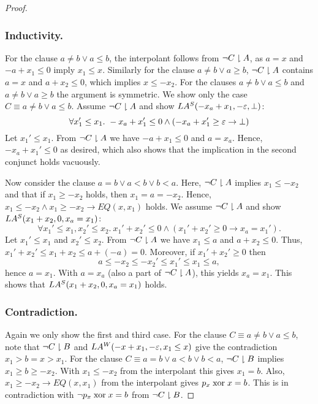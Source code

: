 \begin{techreport}
\begin{proof}
  \subsubsection*{Inductivity.}  
  \ifnewinterpolation
  For the clause $a\neq b\lor a\leq b$, the interpolant follows 
  from $\lnot C\proj A$, as $a=x$ and $-a + x_1 \leq 0$
  imply $x_1\leq x$. Similarly for the clause $a\neq b\lor a\geq b$,
  $\lnot C\proj A$ contains
  $a=x$ and $a + x_2 \leq 0$, which implies $x \leq -x_2$.
  \else
  For the clauses $a\neq b\lor a\leq b$ and $a\neq b\lor a\geq b$ the argument
  is symmetric.  We show only the case $C \equiv a\neq b \lor a\leq b$. 
  Assume $\lnot C\proj A$ and show $LA\S(-x_a+x_1,-\eps,\bot)$:
  \[
  \forall x_1' \leq x_1.~ -x_a+x_1' \leq 0 \land 
  (-x_a+x_1' \geq \eps \rightarrow \bot)
  \]
  Let $x_1'\leq x_1$. From $\lnot C \proj A$ we have $-a+x_1\leq 0$ and
  $a=x_a$. Hence, $-x_a + x_1' \leq 0$ as desired, which also shows that the
  implication in the second conjunct holds vacuously.

  \fi
  Now consider the clause $a= b\lor a< b \lor b< a$.
  \ifnewinterpolation
  Here, $\lnot C\proj A$ implies $x_1\leq -x_2$ and 
  that if $x_1\geq -x_2$ holds, then $x_1 = a =-x_2$. 
  Hence, $x_1\leq -x_2 \land x_1 \geq -x_2 \rightarrow EQ(x, x_1)$ holds.
  \else
  We assume $\lnot C\proj A$ and show $LA\S(x_1+x_2,0,x_a=x_1)$:
  \[\forall x_1' \leq x_1, x_2' \leq x_2.~ 
  x_1'+x_2' \leq 0 \land (x_1'+x_2' \geq 0 \rightarrow x_a = x_1').\]
  Let $x_1'\leq x_1$ and $x_2'\leq x_2$. 
  From $\lnot C\proj A$ we have $x_1 \leq a$ and $a+x_2\leq 0$.
  Thus, $x_1'+x_2' \leq x_1+x_2 \leq a + (-a) = 0$.
  Moreover, if $x_1'+x_2' \geq 0$ then
  \[ a\leq -x_2 \leq -x_2' \leq x_1' \leq x_1 \leq a,\]
  hence $a=x_1$.  With $a=x_a$ (also a part of $\lnot C \proj A$),
  this yields $x_a=x_1$.
  This shows that $LA\S(x_1+x_2,0,x_a=x_1)$ holds.
  \fi
  
  \subsubsection*{Contradiction.}
  Again we only show the first and third case. For the clause
  $C \equiv a\neq b \lor a\leq b$,
  \ifnewinterpolation
  note that $\lnot C\proj B$ and $LA\W(-x+x_1,-\eps,x_1 \leq x)$ 
  give the contradiction $x_1 > b = x > x_1$.
  For the clause $C \equiv a= b\lor a< b \lor b< a$,
  $\lnot C\proj B$ implies $x_1 \geq b \geq -x_2$. 
  With $x_1\leq -x_2$ from the interpolant this gives $x_1 = b$. Also,
  $x_1\geq -x_2\rightarrow EQ(x, x_1)$ from the interpolant gives
  $p_x \xor x=b$.  This is in contradiction with 
  $\lnot p_x \xor x=b$ from $\lnot C\proj B$.
  

\end{proof}
\end{techreport}
